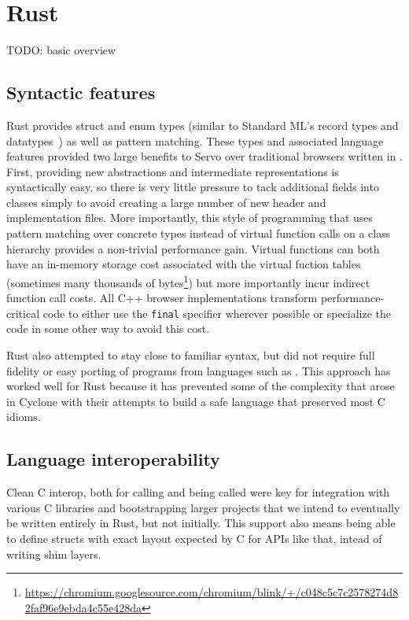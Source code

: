
\section{Rust}
\label{sec:rust}

TODO: basic overview

\subsection{Syntactic features}

Rust provides struct and enum types (similar to Standard ML's record types and datatypes~\cite{sml97-definition}) as
well as pattern matching.
These types and associated language features provided two large benefits to Servo over traditional browsers
written in \Cplusplus{}.
First, providing new abstractions and intermediate representations is syntactically easy, so there is very little
pressure to tack additional fields into classes simply to avoid creating a large number of new header and implementation
files.
More importantly, this style of programming that uses pattern matching over concrete types instead of
virtual function calls on a class hierarchy provides a non-trivial performance gain.
Virtual functions can both have an in-memory storage cost associated with the virtual fuction tables (sometimes many thousands of bytes\footnote{\url{https://chromium.googlesource.com/chromium/blink/+/c048c5c7c2578274d82faf96e9ebda4c55e428da}}) but more importantly
incur indirect function call costs.
All C++ browser implementations transform performance-critical code to either use the \lstinline[language=C]{final}
specifier wherever possible or specialize the code in some other way to avoid this cost.

Rust also attempted to stay close to familiar syntax, but did not require full fidelity or easy porting of
programs from languages such as \Cplusplus.
This approach has worked well for Rust because it has prevented some of the complexity that arose in Cyclone
with their attempts to build a safe language that preserved most C idioms.

\subsection{Language interoperability}
Clean C interop, both for calling and being called were key for integration with various C libraries and bootstrapping larger projects that we intend to eventually be written entirely in Rust, but not initially. This support also means being able to define structs with exact layout expected by C for APIs like that, intead of writing shim layers.

